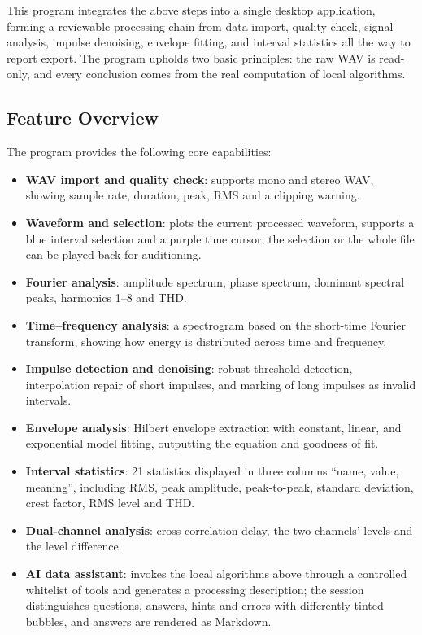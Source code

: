 \documentclass[UTF8,a4paper,12pt]{ctexart}
\begin{document}
This program integrates the above steps into a single desktop application, forming a reviewable processing chain from data import, quality check, signal analysis, impulse denoising, envelope fitting, and interval statistics all the way to report export. The program upholds two basic principles: the raw WAV is read-only, and every conclusion comes from the real computation of local algorithms.

\subsection{Feature Overview}

The program provides the following core capabilities:

\begin{itemize}
  \item \textbf{WAV import and quality check}: supports mono and stereo WAV, showing sample rate, duration, peak, RMS and a clipping warning.
  \item \textbf{Waveform and selection}: plots the current processed waveform, supports a blue interval selection and a purple time cursor; the selection or the whole file can be played back for auditioning.
  \item \textbf{Fourier analysis}: amplitude spectrum, phase spectrum, dominant spectral peaks, harmonics 1--8 and THD.
  \item \textbf{Time--frequency analysis}: a spectrogram based on the short-time Fourier transform, showing how energy is distributed across time and frequency.
  \item \textbf{Impulse detection and denoising}: robust-threshold detection, interpolation repair of short impulses, and marking of long impulses as invalid intervals.
  \item \textbf{Envelope analysis}: Hilbert envelope extraction with constant, linear, and exponential model fitting, outputting the equation and goodness of fit.
  \item \textbf{Interval statistics}: 21 statistics displayed in three columns ``name, value, meaning'', including RMS, peak amplitude, peak-to-peak, standard deviation, crest factor, RMS level and THD.
  \item \textbf{Dual-channel analysis}: cross-correlation delay, the two channels' levels and the level difference.
  \item \textbf{AI data assistant}: invokes the local algorithms above through a controlled whitelist of tools and generates a processing description; the session distinguishes questions, answers, hints and errors with differently tinted bubbles, and answers are rendered as Markdown.

\end{itemize}
\end{document}
